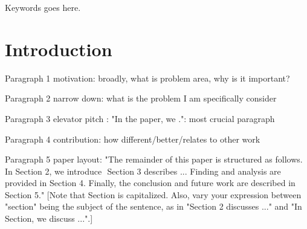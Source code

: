 \documentclass[conference,letterpaper]{IEEEtran}
\begin{document}


\pagestyle{fancy}{
\fancyhf{}
\fancyfoot[R]{}}
\renewcommand{\headrulewidth}{0pt}
\renewcommand{\footrulewidth}{0pt}



\begin{abstract}
The abstract goes here.
\end{abstract}


\begin{IEEEkeywords}
Keywords goes here.
\end{IEEEkeywords}


%
\IEEEpeerreviewmaketitle


\section{Introduction}
%

Paragraph 1 motivation: broadly, what is problem area, why is it important?

Paragraph 2 narrow down: what is the problem I am specifically consider

Paragraph 3 elevator pitch : "In the paper, we .": most crucial paragraph

Paragraph 4 contribution: how different/better/relates to other work

Paragraph 5 paper layout: "The remainder of this paper is structured as follows. In Section 2, we introduce  Section 3 describes ... Finding and analysis are provided in Section 4. Finally, the conclusion and future work are described in Section 5." [Note that Section is capitalized. Also, vary your expression between "section" being the subject of the sentence, as in "Section 2 discusses ..." and "In Section, we discuss ...".]
\end{document}
